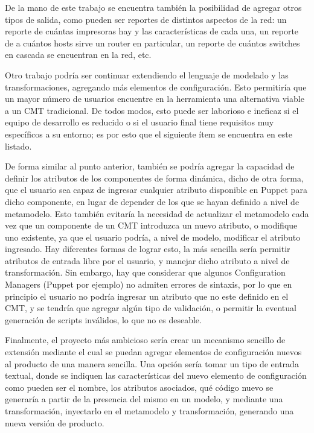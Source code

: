 De la mano de este trabajo se encuentra también la posibilidad de agregar otros tipos de salida, como pueden ser reportes de distintos aspectos de la red: un reporte de cuántas impresoras hay y las características de cada una, un reporte de a cuántos hosts sirve un router en particular, un reporte de cuántos switches en cascada se encuentran en la red, etc. 

Otro trabajo podría ser continuar extendiendo el lenguaje de modelado y las transformaciones, agregando más elementos de configuración. Esto permitiría que un mayor número de usuarios encuentre en la herramienta una alternativa viable a un CMT tradicional. De todos modos, esto puede ser laborioso e ineficaz si el equipo de desarrollo es reducido o si el usuario final tiene requisitos muy específicos a su entorno; es por esto que el siguiente ítem se encuentra en este listado.

De forma similar al punto anterior, también se podría agregar la capacidad de definir los atributos de los componentes de forma dinámica, dicho de otra forma, que el usuario sea capaz de ingresar cualquier atributo disponible en Puppet para dicho componente, en lugar de depender de los que se hayan definido a nivel de metamodelo. Esto también evitaría la necesidad de actualizar el metamodelo cada vez que un componente de un CMT introduzca un nuevo atributo, o modifique uno existente, ya que el usuario podría, a nivel de modelo, modificar el atributo ingresado.
Hay diferentes formas de lograr esto, la más sencilla sería permitir atributos de entrada libre por el usuario, y manejar dicho atributo a nivel de transformación. Sin embargo, hay que considerar que algunos Configuration Managers (Puppet por ejemplo) no admiten errores de sintaxis, por lo que en principio el usuario no podría ingresar un atributo que no este definido en el CMT, y se tendría que agregar algún tipo de validación, o permitir la eventual generación de scripts inválidos, lo que no es deseable.

Finalmente, el proyecto más ambicioso sería crear un mecanismo sencillo de extensión mediante el cual se puedan agregar elementos de configuración nuevos al producto de una manera sencilla. Una opción sería tomar un tipo de entrada textual, donde se indiquen las características del nuevo elemento de configuración como pueden ser el nombre, los atributos asociados, qué código nuevo se generaría a partir de la presencia del mismo en un modelo, y mediante una transformación, inyectarlo en el metamodelo y transformación, generando una nueva versión de producto.

